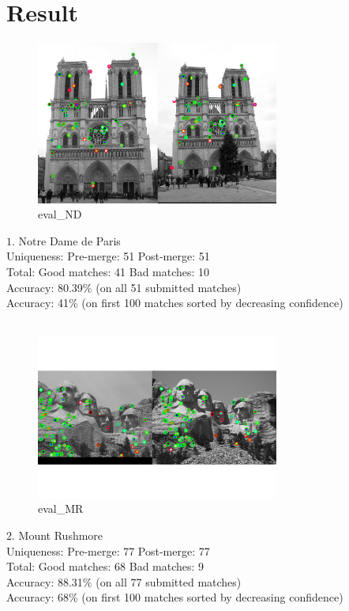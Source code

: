 \section*{Result}
\begin{figure}[!h]
    \centering
    \includegraphics[width=8cm]{eval_ND.png}
    \caption{eval\_ND}
    \label{fig:result1}
\end{figure}
$1.$ Notre Dame de Paris\\
Uniqueness: Pre-merge:    51  Post-merge:  51\\
Total:      Good matches: 41  Bad matches: 10\\
Accuracy:  80.39\% (on all 51 submitted matches)\\
Accuracy:  41\% (on first 100 matches sorted by decreasing confidence)\\
\\
\begin{figure}[!h]
    \centering
    \includegraphics[width=8cm]{eval_MR.png}
    \caption{eval\_MR}
    \label{fig:result1}
\end{figure}
$2.$ Mount Rushmore\\
Uniqueness: Pre-merge:    77  Post-merge:  77\\
Total:      Good matches: 68  Bad matches: 9\\
Accuracy:  88.31\% (on all 77 submitted matches)\\
Accuracy:  68\% (on first 100 matches sorted by decreasing confidence)\\
